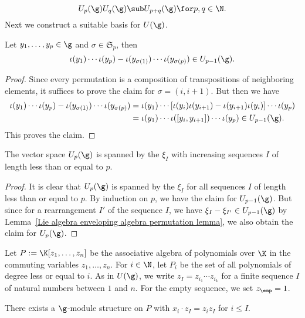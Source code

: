 \[U_p(\g)U_q(\g)\sub U_{p+q}(\g)\for p,q\in\N.\]
Next we construct a suitable basis for $U(\g)$.
\begin{lemma}\label{Lie algebra enveloping algebra permutation lemma}
Let $y_1,\dots,y_p\in\g$ and $\sigma\in\mathfrak{S}_p$, then
\[\iota(y_1)\cdots\iota(y_p)-\iota(y_{\sigma(1)})\cdots\iota(y_{\sigma(p)})\in U_{p-1}(\g).\]
\end{lemma}
\begin{proof}
Since every permutation is a composition of transpositions of neighboring elements, it suffices to prove the claim for $\sigma=(i,i+1)$. But then we have
\begin{align*}
\iota(y_1)\cdots\iota(y_p)-\iota(y_{\sigma(1)})\cdots\iota(y_{\sigma(p)})&=\iota(y_1)\cdots[\iota(y_i)\iota(y_{i+1})-\iota(y_{i+1})\iota(y_i)]\cdots\iota(y_p)\\
&=\iota(y_1)\cdots\iota([y_i,y_{i+1}])\cdots\iota(y_p)\in U_{p-1}(\g).
\end{align*}
This proves the claim.
\end{proof}
\begin{lemma}\label{Lie algebra enveloping algebra generating p-length}
The vector space $U_p(\g)$ is spanned by the $\xi_I$ with increasing sequences $I$ of length less than or equal to $p$.
\end{lemma}
\begin{proof}
It is clear that $U_p(\g)$ is spanned by the $\xi_I$ for all sequences $I$ of length less than or equal to $p$. By induction on $p$, we have the claim for $U_{p-1}(\g)$. But since for a rearrangement $I'$ of the sequence $I$, we have $\xi_I-\xi_{I'}\in U_{p-1}(\g)$ by Lemma~\ref{Lie algebra enveloping algebra permutation lemma}, we also obtain the claim for $U_p(\g)$.
\end{proof}
Let $P:=\K[z_1,\dots,z_n]$ be the associative algebra of polynomials over $\K$ in the commuting variables $z_1,\dots,z_n$. For $i\in\N$, let $P_i$ be the set of all polynomials of degree less or equal to $i$. As in $U(\g)$, we write $z_I=z_{i_1}\cdots z_{i_k}$ for a finite sequence $I$ of natural numbers between $1$ and $n$. For the empty sequence, we set $z_\emp=1$.
\begin{proposition}\label{Lie algebra act on polynomial ring}
There exists a $\g$-module structure on $P$ with $x_i\cdot z_I=z_iz_I$ for $i\leq I$.
\end{proposition}
